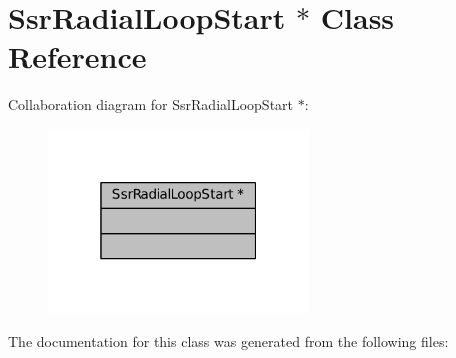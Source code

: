 \hypertarget{classSsrRadialLoopStart_01_5}{}\section{Ssr\+Radial\+Loop\+Start $\ast$ Class Reference}
\label{classSsrRadialLoopStart_01_5}


Collaboration diagram for Ssr\+Radial\+Loop\+Start $\ast$\+:
\nopagebreak
\begin{figure}[H]
\begin{center}
\leavevmode
\includegraphics[width=196pt]{classSsrRadialLoopStart_01_5__coll__graph}
\end{center}
\end{figure}


The documentation for this class was generated from the following files\+: